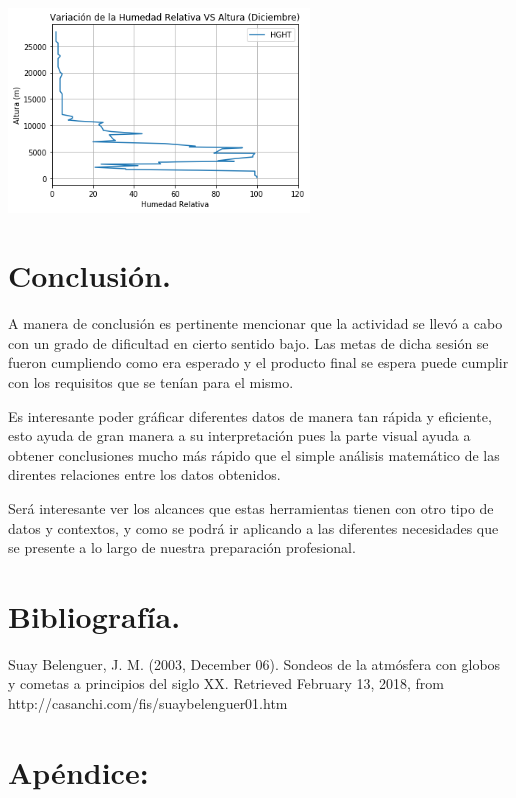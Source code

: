 \documentclass{article} %
\begin{document}
 
 \begin{center}
 	\includegraphics[width=8cm]{10.png}
 \end{center}


\section{Conclusión.}

A manera de conclusión es pertinente mencionar que la actividad se llevó a cabo con un grado de dificultad en cierto sentido bajo. Las metas de dicha sesión se fueron cumpliendo como era esperado y el producto final se espera puede cumplir con los requisitos que se tenían para el mismo.
\vspace{0.5 cm}

Es interesante poder gráficar diferentes datos de manera tan rápida y eficiente, esto ayuda de gran manera a su interpretación pues la parte visual ayuda a obtener conclusiones mucho más rápido que el simple análisis matemático de las direntes relaciones entre los datos obtenidos. 
\vspace{0.5 cm}

Será interesante ver los alcances que estas herramientas tienen con otro tipo de datos y contextos, y como se podrá ir aplicando a las diferentes necesidades que se presente a lo largo de nuestra preparación profesional.


\section*{Bibliografía.}

Suay Belenguer, J. M. (2003, December 06). Sondeos de la atmósfera con globos y cometas a principios del siglo XX. Retrieved February 13, 2018, from http://casanchi.com/fis/suaybelenguer01.htm 

\section*{Apéndice:}
\end{document}
